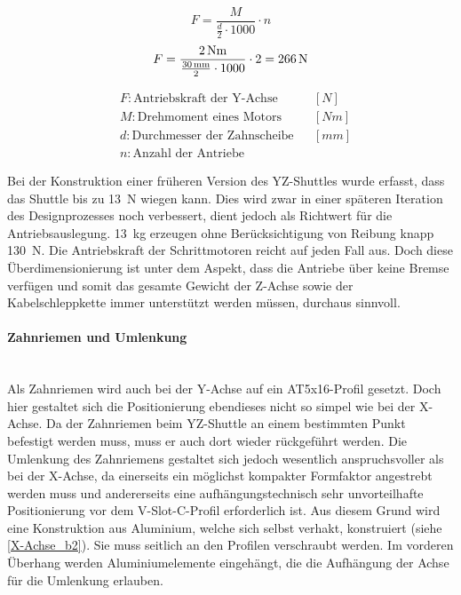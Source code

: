 \vspace{5mm}
\noindent\begin{minipage}{\textwidth}
\begin{minipage}[t]{0.5\textwidth}
    \begin{equation*}
        F = \frac{M}{\frac{d}{2} \cdot 1000} \cdot n
    \end{equation*}
    \begin{equation*}
        F = \frac{2 \, \mathrm{Nm}}{\frac{30 \, \mathrm{mm}}{2} \cdot 1000} \cdot 2 = 266 \, \mathrm{N}
    \end{equation*}
\end{minipage}%
\begin{minipage}[t]{0.4\textwidth}
    \vspace*{-5mm}
    \begin{align*}
        &F: \text{Antriebskraft der Y-Achse} & &\left[N\right]\\
        &M: \text{Drehmoment eines Motors} & &\left[Nm\right]\\
        &d: \text{Durchmesser der Zahnscheibe} & &\left[mm\right]\\
        &n: \text{Anzahl der Antriebe} & &
    \end{align*}
\end{minipage}
\end{minipage}

\vspace{5mm}

Bei der Konstruktion einer früheren Version des YZ-Shuttles wurde erfasst, dass das Shuttle bis zu \SI{13}{\newton} wiegen kann. Dies wird zwar in einer späteren Iteration des Designprozesses noch verbessert, dient jedoch als Richtwert für die Antriebsauslegung. \SI{13}{kg} erzeugen ohne Berücksichtigung von Reibung knapp  \SI{130}{\newton}. Die Antriebskraft der Schrittmotoren reicht auf jeden Fall aus. Doch diese Überdimensionierung ist unter dem Aspekt, dass die Antriebe über keine Bremse verfügen und somit das gesamte Gewicht der Z-Achse sowie der Kabelschleppkette immer unterstützt werden müssen, durchaus sinnvoll.

\paragraph{Zahnriemen und Umlenkung}\mbox{}\\
Als Zahnriemen wird auch bei der Y-Achse auf ein AT5x16-Profil gesetzt. Doch hier gestaltet sich die Positionierung ebendieses nicht so simpel wie bei der X-Achse. Da der Zahnriemen beim YZ-Shuttle an einem bestimmten Punkt befestigt werden muss, muss er auch dort wieder rückgeführt werden. Die Umlenkung des Zahnriemens gestaltet sich jedoch wesentlich anspruchsvoller als bei der X-Achse, da einerseits ein möglichst kompakter Formfaktor angestrebt werden muss und andererseits eine aufhängungstechnisch sehr unvorteilhafte Positionierung vor dem V-Slot-C-Profil erforderlich ist. Aus diesem Grund wird eine Konstruktion aus Aluminium, welche sich selbst verhakt, konstruiert (siehe \ref{X-Achse_b2}). Sie muss seitlich an den Profilen verschraubt werden. Im vorderen Überhang werden Aluminiumelemente eingehängt, die die Aufhängung der Achse für die Umlenkung erlauben.

